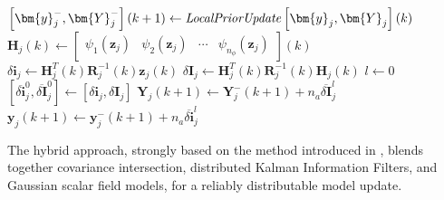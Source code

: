 \begin{algorithm}
    \caption{Distributed Update for Agent $j$ under stable networks}\label{alg:info-kf-update}
    $\left[\bm{y}_j^-,\bm{Y}_j^-\right](k+1)\gets\text{\textit{LocalPriorUpdate}}\left[\bm{y}_j,\bm{Y}_j\right](k)$\;
    $\bm{H}_j(k)\gets \begin{bmatrix} \psi_1(\bm{z}_j) & \psi_2(\bm{z}_j)& \cdots & \psi_{n_{\phi}}(\bm{z}_j) \end{bmatrix}(k)$ 
    $\delta\bm{i}_j\gets\bm{H}_j^T(k)\bm{R}_j^{-1}(k)\bm{z}_j(k)$\;
    $\delta\bm{I}_j\gets\bm{H}_j^T(k)\bm{R}_j^{-1}(k)\bm{H}_j(k)$ 
    $l \gets 0$\;
    $\left[\overline{\delta\bm{i}}_j^0,\overline{\delta\bm{I}}_j^0\right]\gets\left[\delta\bm{i}_j,\delta\bm{I}_j\right]$
    $\bm{Y}_j(k+1)\gets\bm{Y}_j^-(k+1)+n_a\overline{\delta\bm{I}}^l_j$\;
    $\bm{y}_j(k+1)\gets\bm{y}_j^-(k+1)+n_a\overline{\delta\bm{i}}^l_j$
\end{algorithm}

The hybrid approach, strongly based on the method introduced in \cite{tamjidi2021unifying}, blends together covariance intersection, distributed Kalman Information Filters, and Gaussian scalar field models, for a reliably distributable model update.

